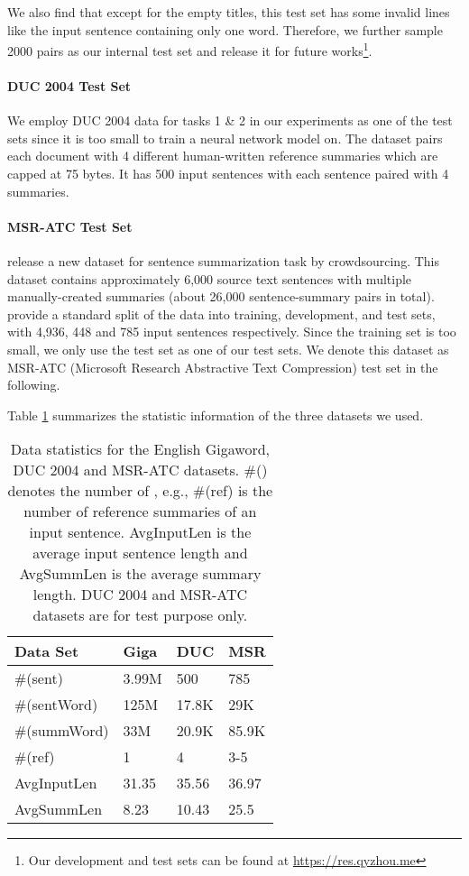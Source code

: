 \documentclass[11pt,a4paper]{article}
\begin{document}
We also find that except for the empty titles, this test set has some invalid lines like the input sentence containing only one word.
Therefore, we further sample 2000 pairs as our internal test set and release it for future works\footnote{Our development and test sets can be found at \url{https://res.qyzhou.me}}.
\paragraph{DUC 2004 Test Set}
We employ DUC 2004 data for tasks 1 \& 2 \citep{over2007duc} in our experiments as one of the test sets since it is too small to train a neural network model on.
The dataset pairs each document with 4 different human-written reference summaries which are capped at 75 bytes.
It has 500 input sentences with each sentence paired with 4 summaries.


\paragraph{MSR-ATC Test Set}
\citet{toutanova-EtAl:2016:EMNLP2016} release a new dataset for sentence summarization task by crowdsourcing.
This dataset contains approximately 6,000 source text sentences with multiple manually-created summaries (about 26,000 sentence-summary pairs in total).
\citet{toutanova-EtAl:2016:EMNLP2016} provide a standard split of the data into training, development, and test sets, with 4,936, 448 and 785 input sentences respectively.
Since the training set is too small, we only use the test set as one of our test sets.
We denote this dataset as MSR-ATC (Microsoft Research Abstractive Text Compression) test set in the following.


Table \ref{dataTable} summarizes the statistic information of the three datasets we used.

\begin{table}[htbp]
	\begin{center}
		\begin{tabular}{llll}
			\toprule
			\bf Data Set & Giga & DUC & MSR \\ 
			\midrule
			\#(sent) & 3.99M  & 500 & 785  \\
			\#(sentWord)  & 125M & 17.8K & 29K \\
			\#(summWord)  & 33M & 20.9K & 85.9K \\
			\#(ref) & 1 & 4 & 3-5  \\
			AvgInputLen & 31.35 & 35.56 & 36.97 \\
			AvgSummLen & 8.23 & 10.43 & 25.5 \\
			\bottomrule
		\end{tabular}
	\end{center}
	\caption{\label{dataTable} Data statistics for the English Gigaword, DUC 2004 and MSR-ATC datasets.
		\#() denotes the number of , e.g., \#(ref) is the number of reference summaries of an input sentence. AvgInputLen is the average input sentence length and AvgSummLen is the average summary length.
		\dag DUC 2004 and MSR-ATC datasets are for test purpose only.}
\end{table}
\end{document}
